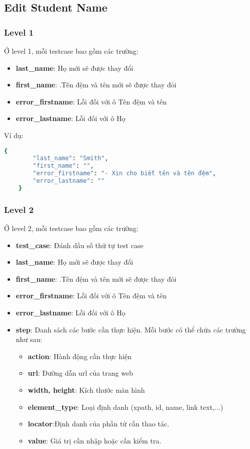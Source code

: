 \subsection{Edit Student Name}
\subsubsection{Level 1}
Ở level 1, mỗi testcase bao gồm các trường:
\begin{itemize}
    \item \textbf{last\_name}: Họ mới sẽ được thay đổi
    \item \textbf{first\_name}: .Tên đệm và tên mới sẽ được thay đỏi
    \item \textbf{error\_firstname}: Lỗi đối với ô Tên đệm và tên
    \item \textbf{error\_lastname}: Lỗi đối với ô Họ
\end{itemize}

Ví dụ:
\begin{lstlisting}[language=bash, caption={Ví dụ testcase ESN-001-0002 ở level 1}]
    {
        "last_name": "Smith",
        "first_name": "",
        "error_firstname": "- Xin cho biết tên và tên đệm",
        "error_lastname": ""
    }
\end{lstlisting}
\subsubsection{Level 2}
Ở level 2, mỗi testcase bao gồm các trường:
\begin{itemize}
    \item \textbf{test\_case}: Đánh dấu số thứ tự test case
    \item \textbf{last\_name}: Họ mới sẽ được thay đổi
    \item \textbf{first\_name}: .Tên đệm và tên mới sẽ được thay đỏi
    \item \textbf{error\_firstname}: Lỗi đối với ô Tên đệm và tên
    \item \textbf{error\_lastname}: Lỗi đối với ô Họ
    \item \textbf{step}: Danh sách các bước cần thực hiện. Mỗi bước có thể chứa các trường như sau:
    \begin{itemize}
        \item \textbf{action}: Hành động cần thực hiện
        \item \textbf{url}: Đường dẫn url của trang web
        \item \textbf{width, height}: Kích thước màn hình
        \item \textbf{element\_type}: Loại định danh (xpath, id, name, link text,...)
        \item \textbf{locator}:Định danh của phần tử cần thao tác.
        \item \textbf{value}: Giá trị cần nhập hoặc cần kiểm tra.
    \end{itemize}
\end{itemize}

